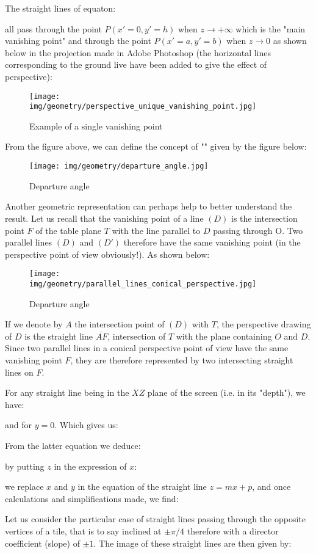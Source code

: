 	The straight lines of equaton:
	
	all pass through the point $P(x'=0,y'=h)$ when $z\rightarrow +\infty$ which is the "main vanishing point" and through the point $P(x'=a,y'=b)$ when $z\rightarrow  0$ as shown below in  the projection made in Adobe Photoshop (the horizontal lines corresponding to the ground live have been added to give the effect of perspective):
	\begin{figure}[H]
		\centering
		\texttt{[image: img/geometry/perspective\_unique\_vanishing\_point.jpg]}
		\caption{Example of a single vanishing point}
	\end{figure}
	From the figure above, we can define the concept of "" given by the figure below:
	\begin{figure}[H]
		\centering
		\texttt{[image: img/geometry/departure\_angle.jpg]}
		\caption{Departure angle}
	\end{figure}
	Another geometric representation can perhaps help to better understand the result. Let us recall that the vanishing point of a line $(D)$ is the intersection point $F$ of the table plane $T$ with the line parallel to $D$ passing through O. Two parallel lines $(D)$ and $(D')$ therefore have the same vanishing point (in the perspective point of view obviously!). As shown below:
	\begin{figure}[H]
		\centering
		\texttt{[image: img/geometry/parallel\_lines\_conical\_perspective.jpg]}
		\caption{Departure angle}
	\end{figure}
	If we denote by $A$ the intersection point of $(D)$ with $T$, the perspective drawing of $D$ is the straight line $\overline{AF}$, intersection of $T$ with the plane containing $O$ and $D$. Since two parallel lines in a conical perspective point of view have the same vanishing point $F$, they are therefore represented by two intersecting straight lines on $F$.
	
	For any straight line being in the $XZ$ plane of the screen (i.e. in its "depth"), we have:
	
	and for $y=0$. Which gives us:
	
	From the latter equation we deduce:
	
	by putting $z$ in the expression of $x$:
	
	we replace $x$ and $y$ in the equation of the straight line $z=mx+p$, and once calculations and simplifications made, we find:
	
	Let us consider the particular case of straight lines passing through the opposite vertices of a tile, that is to say inclined at $\pm\pi/4$ therefore with a director coefficient (slope) of $\pm 1$.
	The image of these straight lines are then given by:
	

